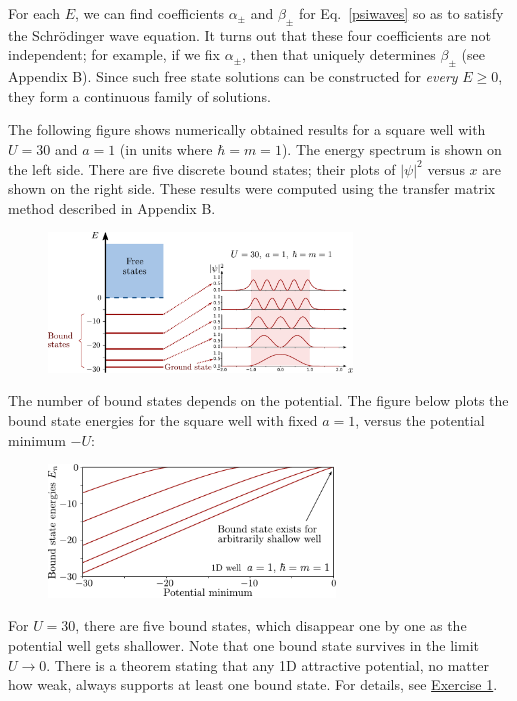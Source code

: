 \documentclass[pra,12pt]{revtex4}
\begin{document}
For each $E$, we can find coefficients $\alpha_\pm$ and $\beta_\pm$
for Eq.~\eqref{psiwaves} so as to satisfy the Schr\"odinger wave
equation.  It turns out that these four coefficients are not
independent; for example, if we fix $\alpha_\pm$, then that uniquely
determines $\beta_\pm$ (see Appendix B).  Since such free state
solutions can be constructed for \textit{every} $E \ge 0$, they form a
continuous family of solutions.

The following figure shows numerically obtained results for a square
well with $U = 30$ and $a=1$ (in units where $\hbar = m =1$).  The
energy spectrum is shown on the left side.  There are five discrete
bound states; their plots of $|\psi|^2$ versus $x$ are shown on the
right side.  These results were computed using the transfer matrix
method described in Appendix B.

\begin{figure}[h]
  \centering\includegraphics[width=0.72\textwidth]{boundvsextended}
\end{figure}

\clearpage
The number of bound states depends on the potential.  The figure below
plots the bound state energies for the square well with fixed $a = 1$,
versus the potential minimum $-U$:

\vskip 0.15in
\begin{figure}[h]
  \centering\includegraphics[width=0.68\textwidth]{boundstate1d}
\end{figure}

\noindent
For $U = 30$, there are five bound states, which disappear one by one
as the potential well gets shallower.  Note that one bound state
survives in the limit $U \rightarrow 0$.  There is a theorem stating
that any 1D attractive potential, no matter how weak, always supports
at least one bound state.  For details, see
\hyperref[ex:boundstate]{Exercise 1}.
\end{document}
